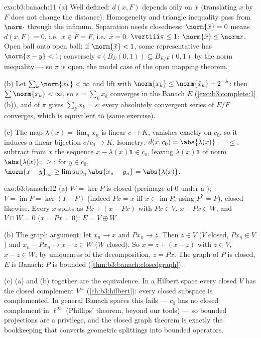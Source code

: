 \begin{solution}{exo:b3:banach:11}
(a) Well defined: $d(x, F)$ depends only on $\bar x$
(translating $x$ by $F$ does not change the distance).
Homogeneity and triangle inequality pass from $\norm\cdot$
through the infimum. Separation needs closedness: $\norm{\bar
x} = 0$ means $d(x, F) = 0$, i.e.\ $x \in \bar F = F$, i.e.\
$\bar x = 0$. $\vertiii\pi \leq 1$: $\norm{\bar x} \leq
\norm x$. Open ball onto open ball: if $\norm{\bar x} < 1$,
some representative has $\norm{x - y} < 1$; conversely
$\pi(B_E(0,1)) \subseteq B_{E/F}(0,1)$ by the norm
inequality --- so $\pi$ is open, the model case of the open
mapping theorem.

(b) Let $\sum_k\norm{\bar x_k} < \infty$ and lift with
$\norm{x_k} \leq \norm{\bar x_k} + 2^{-k}$: then
$\sum\norm{x_k} < \infty$, so $s = \sum_kx_k$ converges in
the Banach $E$ (\cref{exo:b3:complete:1}(b)), and 
of $\pi$ gives $\sum_k\bar x_k = \bar s$: every absolutely
convergent series of $E/F$ converges, which is equivalent to
 (same exercise).

(c) The map $\lambda(x) = \lim_nx_n$ is linear $c \to K$,
vanishes exactly on $c_0$, so it induces a linear bijection
$c/c_0 \to K$. Isometry: $d(x, c_0) = \abs{\lambda(x)}$ ---
$\leq$: subtract from $x$ the sequence $x - \lambda(x)\mathbf
1 \in c_0$, leaving $\lambda(x)\mathbf 1$ of norm
$\abs{\lambda(x)}$; $\geq$: for $y \in c_0$, $\norm{x -
y}_\infty \geq \limsup_n\abs{x_n - y_n} = \abs{\lambda(x)}$.
\end{solution}

\begin{solution}{exo:b3:banach:12}
(a) $W = \ker P$ is closed (preimage of $0$ under a
); $V = \operatorname{im}P = \ker(I - P)$
(indeed $Px = x$ iff $x \in \operatorname{im}P$, using $P^2 =
P$), closed likewise. Every $x$ splits as $Px + (x - Px)$
with $Px \in V$, $x - Px \in W$, and $V \cap W = 0$ ($x = Px
= 0$): $E = V \oplus W$.

(b) The graph argument: let $x_n \to x$ and $Px_n \to z$.
Then $z \in V$ ($V$ closed, $Px_n \in V$) and $x_n - Px_n \to
x - z \in W$ ($W$ closed). So $x = z + (x - z)$ with $z \in
V$, $x - z \in W$; by uniqueness of the decomposition, $z =
Px$. The graph of $P$ is closed, $E$ is Banach: $P$ is
bounded (\cref{thm:b3:banach:closedgraph}).

(c) (a) and (b) together are the equivalence. In a Hilbert
space every closed $V$ has the closed complement $V^\perp$
(\cref{ch:b3:hilbert}): every closed subspace is
complemented. In general Banach spaces this fails --- $c_0$
has no closed complement in $\ell^\infty$ (Phillips'
theorem, beyond our tools) --- so bounded projections are a
privilege, and the closed graph theorem is exactly the
bookkeeping that converts geometric splittings into bounded
operators.
\end{solution}

